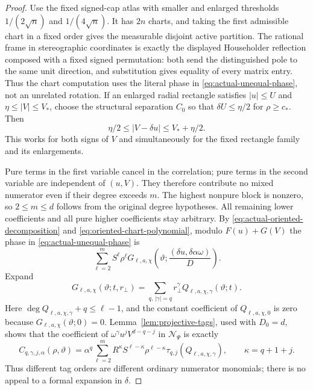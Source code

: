 \documentclass[11pt]{article}
\numberwithin{equation}{section}
\theoremstyle{remark}
\theoremstyle{definition}
\begin{document}
\begin{proof}
Use the fixed signed-cap atlas with smaller and enlarged thresholds
$1/(2\sqrt n)$ and $1/(4\sqrt n)$.  It has $2n$ charts, and taking the
first admissible chart in a fixed order gives the measurable disjoint
active partition.  The rational frame in stereographic coordinates is
exactly the displayed Householder reflection composed with a fixed
signed permutation: both send the distinguished pole to the same unit
direction, and substitution gives equality of every matrix entry.
Thus the chart computation uses the literal phase in
\eqref{eq:actual-unequal-phase}, not an unrelated rotation.
If an enlarged radial rectangle satisfies $|u|\le U$ and
$\eta\le|V|\le V_*$, choose the structural separation $C_0$ so that
$\delta U\le\eta/2$ for $\rho\ge c_*$.  Then
\[
 \eta/2\le|V-\delta u|\le V_*+\eta/2.
\]
This works for both signs of $V$ and simultaneously for the fixed
rectangle family and its enlargements.

Pure terms in the first variable cancel in the correlation; pure terms
in the second variable are independent of $(u,V)$.  They therefore
contribute no mixed numerator even if their degree exceeds $m$.
The highest nonpure block is nonzero, so $2\le m\le d$ follows from
the original degree hypotheses.  All remaining lower coefficients
and all pure higher coefficients stay arbitrary.
By \eqref{eq:actual-oriented-decomposition} and
\eqref{eq:oriented-chart-polynomial}, modulo
\(F(u)+G(V)\) the phase in \eqref{eq:actual-unequal-phase} is
\begin{equation}\label{eq:actual-phase-block-sum}
 \sum_{\ell=2}^mS^\ell\rho^\ell
 G_{\ell,a,\chi}\left(\vartheta;
 \frac{(\delta u,\delta\alpha\omega)}{D}\right).
\end{equation}
Expand
\[
 G_{\ell,a,\chi}(\vartheta;t,r_\perp)
 =\sum_{q,\,|\gamma|=q}r_\perp^\gamma
 Q_{\ell,a,\chi,\gamma}(\vartheta;t).
\]
Here
\(\deg Q_{\ell,a,\chi,\gamma}+q\le\ell-1\), and the constant
coefficient of \(Q_{\ell,a,\chi,0}\) is zero because
\(G_{\ell,a,\chi}(\vartheta;0)=0\).
Lemma~\ref{lem:projective-tags}, used with \(D_0=d\), shows that the
coefficient of
\(\omega^\gamma u^jV^{d-q-j}\) in \(\mathcal N_\Psi\) is exactly
\begin{equation}\label{eq:actual-tag-coefficient}
 C_{q,\gamma,j,\alpha}(\rho,\vartheta)
 =\alpha^q\sum_{\ell=2}^m
 R^\kappa S^{\ell-\kappa}\rho^{\ell-\kappa}
 \tau_{q,j}(Q_{\ell,a,\chi,\gamma}),
 \qquad \kappa=q+1+j.
\end{equation}
Thus different tag orders are different ordinary numerator monomials;
there is no appeal to a formal expansion in \(\delta\).


\end{proof}
\end{document}
